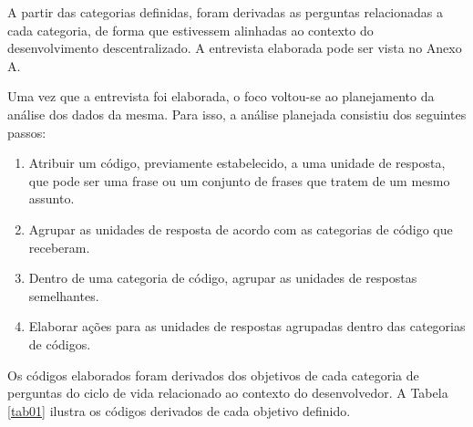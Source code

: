 A partir das categorias definidas, foram derivadas as perguntas relacionadas a cada categoria, de forma que estivessem alinhadas ao contexto do desenvolvimento descentralizado. A entrevista elaborada pode ser vista no Anexo A.

Uma vez que a entrevista foi elaborada, o foco voltou-se ao planejamento da análise dos dados da mesma. Para isso, a análise planejada consistiu dos seguintes passos:

\begin{enumerate}
\item Atribuir um código, previamente estabelecido, a uma unidade de resposta, que pode ser uma frase ou um conjunto de frases que tratem de um mesmo assunto.
\item Agrupar as unidades de resposta de acordo com as categorias de código que receberam.
\item Dentro de uma categoria de código, agrupar as unidades de respostas semelhantes.
\item Elaborar ações para as unidades de respostas agrupadas dentro das categorias de códigos.
\end{enumerate}

Os códigos elaborados foram derivados dos objetivos de cada categoria de perguntas do ciclo de vida relacionado ao contexto do desenvolvedor. A Tabela \ref{tab01} ilustra os códigos derivados de cada objetivo definido.

